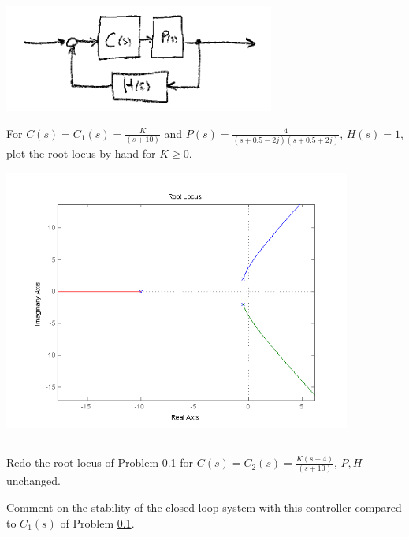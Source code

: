 \documentclass{article}	%
\begin{document}
\subsection{}\label{basicRL}

\includegraphics[width=3.5in]{00479.png}

For $C(s) = C_1(s) = \frac{K}{(s+10)}$ and $P(s) = \frac{4}{(s+0.5-2j)(s+0.5+2j)}$, $H(s) = 1$, plot the
root locus by hand for $K\geq 0$.

\begin{solution}
\includegraphics[width=4.5in]{hw7_6.png}
\end{solution}





\subsection{}
Redo the root locus of Problem \ref{basicRL} for $C(s) = C_2(s) = \frac{K(s+4)}{(s+10)}$, $P, H$ unchanged.

Comment on the stability of the closed loop system with this controller compared to $C_1(s)$ of Problem \ref{basicRL}.
\end{document}
